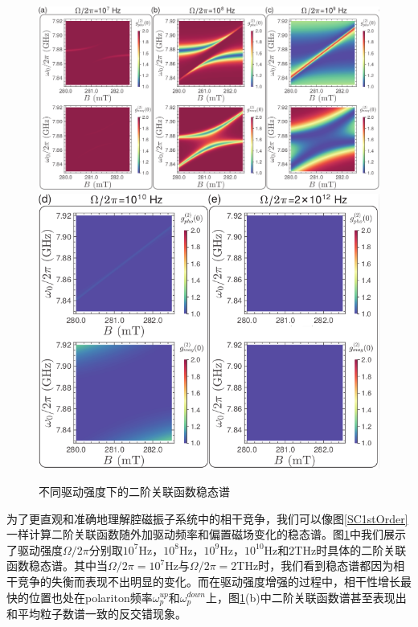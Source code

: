 \begin{figure}[htbp]
	\centering
	\includegraphics[width=3\basefigurewidth,clip]{./figure/4_3_1}
	\includegraphics[width=2\basefigurewidth,clip]{./figure/4_3_2}
	\caption{不同驱动强度下的二阶关联函数稳态谱} 
	\label{Sepctrum2edOrder1}
\end{figure}
为了更直观和准确地理解腔磁振子系统中的相干竞争，我们可以像图\ref{SC1stOrder}一样计算二阶关联函数随外加驱动频率和偏置磁场变化的稳态谱。图\ref{Sepctrum2edOrder1}中我们展示了驱动强度$\Omega/2\pi$分别取$10^{7}$Hz，$10^{8}$Hz，$10^{9}$Hz，$10^{10}$Hz和$2$THz时具体的二阶关联函数稳态谱。其中当$\Omega/2\pi=10^{7}$Hz与$\Omega/2\pi=2$THz时，我们看到稳态谱都因为相干竞争的失衡而表现不出明显的变化。而在驱动强度增强的过程中，相干性增长最快的位置也处在polariton频率$\omega_p^{up}$和$\omega_p^{down}$上，图\ref{Sepctrum2edOrder1}(b)中二阶关联函数谱甚至表现出和平均粒子数谱一致的反交错现象。
